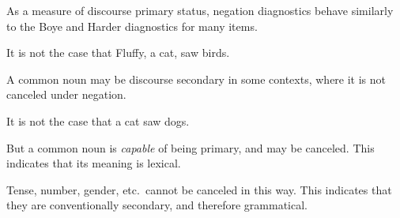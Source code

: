 \documentclass{beamer}
\begin{document}
\begin{frame}{As a measure of discourse primary status, negation diagnostics behave similarly to the Boye and Harder diagnostics for many items.}

  \ex It is not the case that Fluffy, a cat, saw birds. \xe
  
  A common noun may be discourse secondary in some contexts, where it is not canceled under negation.
  
  \ex It is not the case that a cat saw dogs. \xe

  But a common noun is \emph{capable} of being primary, and may be canceled.
  This indicates that its meaning is lexical.

  \vfill
  
  Tense, number, gender, etc.\ cannot be canceled in this way.
  This indicates that they are conventionally secondary, and therefore grammatical.
\end{frame}


  


  




\end{document}
